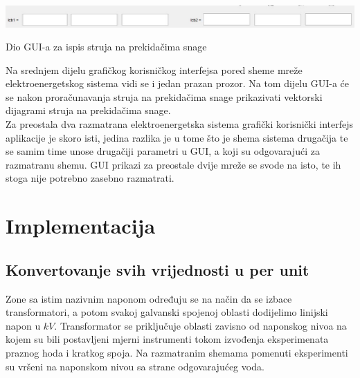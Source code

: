 \documentclass[a4paper, 12pt]{article}
\numberwithin{figure}{section}
\numberwithin{equation}{section}
\begin{document}
\begin{center}
    \captionsetup{type=figure}
    \begin{center}
        \includegraphics[width=\textwidth]{slike/shema1gui_donji.eps}
        \caption{Dio GUI-a za ispis struja na prekidačima snage}
        \label{E3}
    \end{center}
\end{center}

Na srednjem dijelu grafičkog korisničkog interfejsa pored sheme mreže elektroenergetskog sistema vidi se i jedan prazan prozor. Na tom dijelu GUI-a će se nakon proračunavanja struja na prekidačima snage prikazivati vektorski dijagrami struja na prekidačima snage.\\

Za preostala dva razmatrana elektroenergetska sistema grafički korisnički interfejs aplikacije je skoro isti, jedina razlika je u tome što je shema sistema drugačija te se samim time unose drugačiji parametri u GUI, a koji su odgovarajući za razmatranu shemu. GUI prikazi za preostale dvije mreže se svode na isto, te ih stoga nije potrebno zasebno razmatrati.\\






















\newpage
\section{Implementacija}

\subsection{Konvertovanje svih vrijednosti u per unit}

Zone sa istim nazivnim naponom određuju se na način da se izbace transformatori, a potom svakoj galvanski spojenoj oblasti dodijelimo linijski napon u $kV$. Transformator se priključuje oblasti zavisno od naponskog nivoa na kojem su bili postavljeni mjerni instrumenti tokom izvođenja eksperimenata praznog hoda i kratkog spoja. Na razmatranim shemama pomenuti eksperimenti su vršeni na naponskom nivou sa strane odgovarajućeg voda. \\
\end{document}
